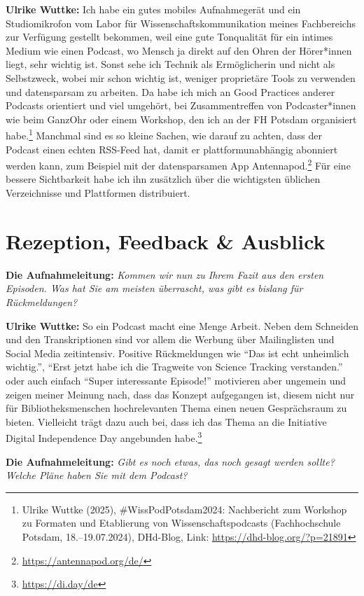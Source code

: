 \documentclass[a4paper,
fontsize=11pt,
oneside,
numbers=noperiodatend,
parskip=half-,
bibliography=totoc,
final
]{scrartcl}
\begin{document}
\textbf{Ulrike Wuttke:} Ich habe ein gutes mobiles Aufnahmegerät und ein
Studiomikrofon vom Labor für Wissenschaftskommunikation meines
Fachbereichs zur Verfügung gestellt bekommen, weil eine gute Tonqualität
für ein intimes Medium wie einen Podcast, wo Mensch ja direkt auf den
Ohren der Hörer*innen liegt, sehr wichtig ist. Sonst sehe ich Technik
als Ermöglicherin und nicht als Selbstzweck, wobei mir schon wichtig
ist, weniger proprietäre Tools zu verwenden und datensparsam zu
arbeiten. Da habe ich mich an Good Practices anderer Podcasts orientiert
und viel umgehört, bei Zusammentreffen von Podcaster*innen wie beim
GanzOhr oder einem Workshop, den ich an der FH Potsdam organisiert
habe.\footnote{Ulrike Wuttke (2025), \#WissPodPotsdam2024: Nachbericht
  zum Workshop zu Formaten und Etablierung von Wissenschaftspodcasts
  (Fachhochschule Potsdam, 18.--19.07.2024), DHd-Blog, Link:
  \url{https://dhd-blog.org/?p=21891}} Manchmal sind es so kleine
Sachen, wie darauf zu achten, dass der Podcast einen echten RSS-Feed
hat, damit er plattformunabhängig abonniert werden kann, zum Beispiel
mit der datensparsamen App Antennapod.\footnote{\url{https://antennapod.org/de/}}
Für eine bessere Sichtbarkeit habe ich ihn zusätzlich über die
wichtigsten üblichen Verzeichnisse und Plattformen distribuiert.

\section{Rezeption, Feedback \&
Ausblick}\label{rezeption-feedback-ausblick}

\textbf{Die Aufnahmeleitung:} \emph{Kommen wir nun zu Ihrem Fazit aus
den ersten Episoden. Was hat Sie am meisten überrascht, was gibt es
bislang für Rückmeldungen?}

\textbf{Ulrike Wuttke:} So ein Podcast macht eine Menge Arbeit. Neben
dem Schneiden und den Transkriptionen sind vor allem die Werbung über
Mailinglisten und Social Media zeitintensiv. Positive Rückmeldungen wie
\enquote{Das ist echt unheimlich wichtig.}, \enquote{Erst jetzt habe ich
die Tragweite von Science Tracking verstanden.} oder auch einfach
\enquote{Super interessante Episode!} motivieren aber ungemein und
zeigen meiner Meinung nach, dass das Konzept aufgegangen ist, diesem
nicht nur für Bibliotheksmenschen hochrelevanten Thema einen neuen
Gesprächsraum zu bieten. Vielleicht trägt dazu auch bei, dass ich das
Thema an die Initiative Digital Independence Day angebunden
habe.\footnote{\url{https://di.day/de}}

\textbf{Die Aufnahmeleitung:} \emph{Gibt es noch etwas, das noch gesagt
werden sollte? Welche Pläne haben Sie mit dem Podcast?}
\end{document}
